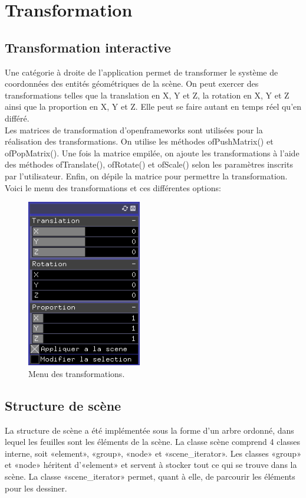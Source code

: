 \section{Transformation}
\subsection{Transformation interactive}
Une catégorie à droite de l’application permet de transformer le système de coordonnées des entités géométriques de la scène. On peut exercer des transformations telles que la translation en X, Y et Z, la rotation en X, Y et Z ainsi que la proportion en X, Y et Z. Elle peut se faire autant en temps réel qu’en différé. \\

Les matrices de transformation d’openframeworks sont utilisées pour la réalisation des transformations. On utilise les méthodes ofPushMatrix() et ofPopMatrix(). Une fois la matrice empilée, on ajoute les transformations à l’aide des méthodes ofTranslate(), ofRotate() et ofScale() selon les paramètres inscrits par l’utilisateur. Enfin, on dépile la matrice pour permettre la transformation.\\

Voici le menu des transformations et ces différentes options:\\
\begin{figure}[h]
	\centering
	\includegraphics[width=5cm]{fig/transformations.png}
	\caption{Menu des transformations.}
	\label{fig:transformations}
\end{figure}

\subsection{Structure de scène}
La structure de scène a été implémentée sous la forme d'un arbre ordonné, dans lequel les feuilles sont les éléments de la scène. La classe scène comprend 4 classes interne, soit «element», «group», «node» et «scene\_iterator». Les classes «group» et «node» héritent d'«element» et  servent à stocker tout ce qui se trouve dans la scène. La classe «scene\_iterator» permet, quant à elle, de parcourir les éléments pour les dessiner. \\

